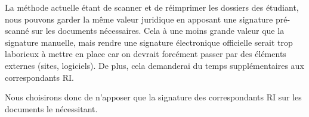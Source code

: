 La méthode actuelle étant de scanner et de réimprimer les dossiers des étudiant, nous pouvons garder la même valeur juridique en apposant une signature pré-scanné sur les documents nécessaires. Cela à une moins grande valeur que la signature manuelle, mais rendre une signature électronique officielle serait trop laborieux à mettre en place car on devrait forcément passer par des éléments externes (sites, logiciels). De plus, cela demanderai du temps supplémentaires aux correspondants RI.

Nous choisirons donc de n'apposer que la signature des correspondants RI sur les documents le nécessitant.
